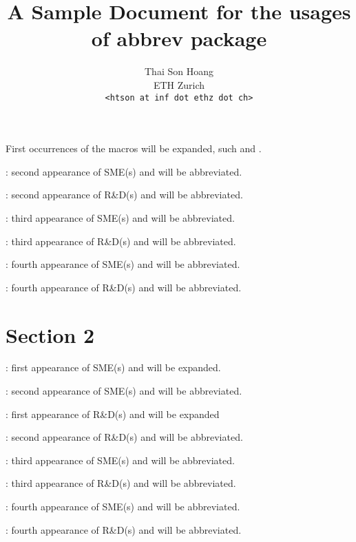 \title{A Sample Document for the usages of \textsf{abbrev} package}
\author{Thai Son Hoang\\ETH Zurich\\\texttt{<htson at inf dot ethz dot
    ch>}}


\maketitle


First occurrences of the macros will be expanded, such \SMEs and \randd{}.

\SME: second appearance of SME(s) and will be abbreviated. 

\randds: second appearance of R\&D(s) and will be abbreviated.

\SMEs: third appearance of SME(s) and will be abbreviated.

\randds: third appearance of R\&D(s) and will be abbreviated.

\SMEs: fourth appearance of SME(s) and will be abbreviated.

\randd: fourth appearance of R\&D(s) and will be abbreviated.

\section{Section 2}
\label{sec:section-2}

\resetabbrev

\SMEs: first appearance of SME(s) and will be expanded.

\SME: second appearance of SME(s) and will be abbreviated. 

\randd: first appearance of R\&D(s) and will be expanded

\randds: second appearance of R\&D(s) and will be abbreviated.

\SMEs: third appearance of SME(s) and will be abbreviated.

\randds: third appearance of R\&D(s) and will be abbreviated.

\SMEs: fourth appearance of SME(s) and will be abbreviated.

\randd: fourth appearance of R\&D(s) and will be abbreviated.

\printnomenclature


